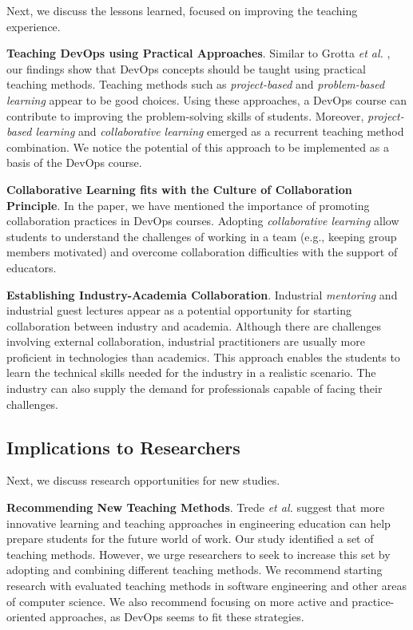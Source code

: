 \documentclass[10pt,conference]{IEEEtran}
\begin{document}
Next, we discuss the lessons learned, focused on improving the teaching experience.

\textbf{Teaching DevOps using Practical Approaches}. Similar to Grotta \textit{et al.} \cite{grotta:2022}, our findings show that DevOps concepts should be taught using practical teaching methods. Teaching methods such as \textsl{project-based} and \textsl{problem-based learning} appear to be good choices. Using these approaches, a DevOps course can contribute to improving the problem-solving skills of students. Moreover, \textsl{project-based learning} and \textsl{collaborative learning} emerged as a recurrent teaching method combination. We notice the potential of this approach to be implemented as a basis of the DevOps course.


\textbf{Collaborative Learning fits with the Culture of Collaboration Principle}. In the paper, we have mentioned the importance of promoting collaboration practices in DevOps courses. Adopting \textsl{collaborative learning} allow students to understand the challenges of working in a team (e.g., keeping group members motivated) and overcome collaboration difficulties with the support of educators. 


\textbf{Establishing Industry-Academia Collaboration}. Industrial \textsl{mentoring} and industrial guest lectures appear as a potential opportunity for starting collaboration between industry and academia. Although there are challenges involving external collaboration, industrial practitioners are usually more proficient in technologies than academics. This approach enables the students to learn the technical skills needed for the industry in a realistic scenario. The industry can also supply the demand for professionals capable of facing their challenges.  



\subsection{Implications to Researchers} 

Next, we discuss research opportunities for new studies.


\textbf{Recommending New Teaching Methods}. Trede \textit{et al.} \cite{trede:2021}  suggest that more innovative learning and teaching approaches in engineering education can help prepare students for the future world of work. Our study identified a set of teaching methods. However, we urge researchers to seek to increase this set by adopting and combining different teaching methods. We recommend starting research with evaluated teaching methods in software engineering and other areas of computer science. We also recommend focusing on more active and practice-oriented approaches, as DevOps seems to fit these strategies.
\end{document}
